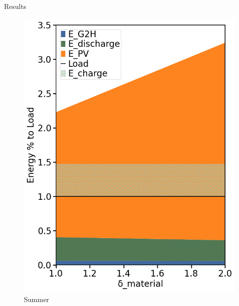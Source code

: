 \begin{frame}[c]{Results}
\begin{itemize}
\begin{figure}[htbp]
\begin{minipage}{0.24\linewidth}
                    \includegraphics[width=\linewidth]{Figures/summer.png}
                    \footnotesize
                    \caption{Summer}
                \end{minipage}\hfill
            \end{figure} 

    \end{itemize}
    
\end{frame}